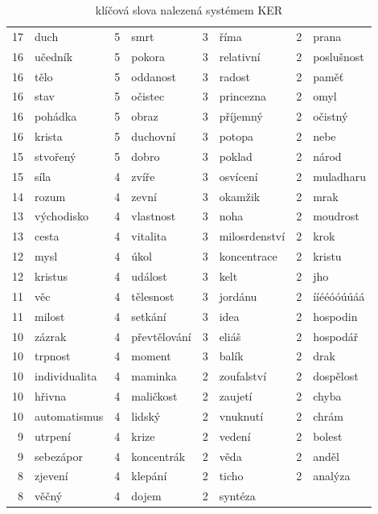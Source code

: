 \begin{table}[htpb]
\begin{center}
\begin{tabular}{|r l|r l|r l|r l|}
17 & duch	 & 5 & smrt	 & 3 & říma	 & 2 & prana	 \\
16 & učedník	 & 5 & pokora	 & 3 & relativní	 & 2 & poslušnost	 \\
16 & tělo	 & 5 & oddanost	 & 3 & radost	 & 2 & paměť	 \\
16 & stav	 & 5 & očistec	 & 3 & princezna	 & 2 & omyl	 \\
16 & pohádka	 & 5 & obraz	 & 3 & příjemný	 & 2 & očistný	 \\
16 & krista	 & 5 & duchovní	 & 3 & potopa	 & 2 & nebe	 \\
15 & stvořený	 & 5 & dobro	 & 3 & poklad	 & 2 & národ	 \\
15 & síla	 & 4 & zvíře	 & 3 & osvícení	 & 2 & muladharu	 \\
14 & rozum	 & 4 & zevní	 & 3 & okamžik	 & 2 & mrak	 \\
13 & východisko	 & 4 & vlastnost	 & 3 & noha	 & 2 & moudrost	 \\
13 & cesta	 & 4 & vitalita	 & 3 & milosrdenství	 & 2 & krok	 \\
12 & mysl	 & 4 & úkol	 & 3 & koncentrace	 & 2 & kristu	 \\
12 & kristus	 & 4 & událost	 & 3 & kelt	 & 2 & jho	 \\
11 & věc	 & 4 & tělesnost	 & 3 & jordánu	 & 2 & ííééóóúúáá	 \\
11 & milost	 & 4 & setkání	 & 3 & idea	 & 2 & hospodin	 \\
10 & zázrak	 & 4 & převtělování	 & 3 & eliáš	 & 2 & hospodář	 \\
10 & trpnost	 & 4 & moment	 & 3 & balík	 & 2 & drak	 \\
10 & individualita	 & 4 & maminka	 & 2 & zoufalství	 & 2 & dospělost	 \\
10 & hřivna	 & 4 & maličkost	 & 2 & zaujetí	 & 2 & chyba	 \\
10 & automatismus	 & 4 & lidský	 & 2 & vnuknutí	 & 2 & chrám	 \\
9 & utrpení	 & 4 & krize	 & 2 & vedení	 & 2 & bolest	 \\
9 & sebezápor	 & 4 & koncentrák	 & 2 & věda	 & 2 & anděl	 \\
8 & zjevení	 & 4 & klepání	 & 2 & ticho	 & 2 & analýza	 \\
8 & věčný	 & 4 & dojem	 & 2 & syntéza	 &   &                  \\
\hline
\end{tabular}
\caption{klíčová slova nalezená systémem KER}\label{tab:ker}
\end{center}
\end{table}

